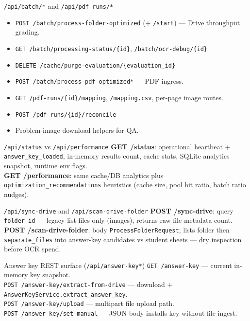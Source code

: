 \documentclass[aspectratio=169]{beamer}
\begin{document}
\begin{frame}{\texttt{/api/batch/*} and \texttt{/api/pdf-runs/*}}
  \tiny
  \begin{itemize}\setlength\itemsep{0.1em}
    \item \texttt{POST /batch/process-folder-optimized} (+ \texttt{/start}) --- Drive throughput grading.
    \item \texttt{GET /batch/processing-status/\{id\}}, \texttt{/batch/ocr-debug/\{id\}}
    \item \texttt{DELETE /cache/purge-evaluation/\{evaluation\_id\}}
    \item \texttt{POST /batch/process-pdf-optimized*} --- PDF ingress.
    \item \texttt{GET /pdf-runs/\{id\}/mapping}, \texttt{/mapping.csv}, per-page image routes.
    \item \texttt{POST /pdf-runs/\{id\}/reconcile}
    \item Problem-image download helpers for QA.
  \end{itemize}
\end{frame}

\begin{frame}{\texttt{/api/status} vs \texttt{/api/performance}}
  \small
  \textbf{GET /status}: operational heartbeat + \texttt{answer\_key\_loaded}, in-memory results count, cache stats, SQLite analytics snapshot, runtime env flags.\\
  \textbf{GET /performance}: same cache/DB analytics plus \texttt{optimization\_recommendations} heuristics (cache size, pool hit ratio, batch ratio nudges).
\end{frame}

\begin{frame}{\texttt{/api/sync-drive} and \texttt{/api/scan-drive-folder}}
  \small
  \textbf{POST /sync-drive}: query \texttt{folder\_id} --- legacy list-files only (images), returns raw file metadata count.\\
  \textbf{POST /scan-drive-folder}: body \texttt{ProcessFolderRequest}; lists folder then \texttt{separate\_files} into answer-key candidates vs student sheets --- dry inspection before OCR spend.
\end{frame}

\begin{frame}{Answer key REST surface (\texttt{/api/answer-key*})}
  \tiny
  \texttt{GET /answer-key} --- current in-memory key snapshot.\\
  \texttt{POST /answer-key/extract-from-drive} --- download + \texttt{AnswerKeyService.extract\_answer\_key}.\\
  \texttt{POST /answer-key/upload} --- multipart file upload path.\\
  \texttt{POST /answer-key/set-manual} --- JSON body installs key without file ingest.
\end{frame}
\end{document}
